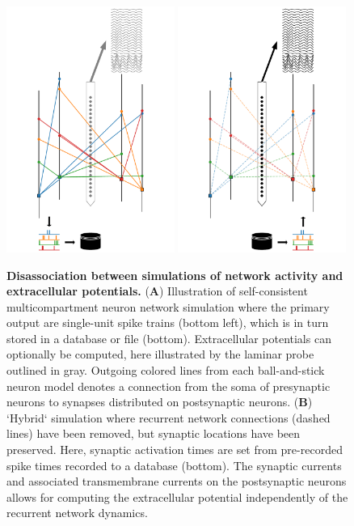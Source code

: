 \begin{figure}[!ht]
\begin{center}
\includegraphics[width=0.49\textwidth]{Figures/Ch-LFPy/Ch-LFPy-hybrid_A.pdf}
\includegraphics[width=0.49\textwidth]{Figures/Ch-LFPy/Ch-LFPy-hybrid_B.pdf}
\end{center}
\caption{\textbf{Disassociation between simulations of network activity and extracellular potentials.}
({\bf A}) Illustration of self-consistent multicompartment neuron network simulation where the primary output are single-unit spike trains (bottom left),
which is in turn stored in a database or file (bottom).
Extracellular potentials can optionally be computed,
here illustrated by the laminar probe outlined in gray.
Outgoing colored lines from each ball-and-stick neuron model denotes a connection from the soma of presynaptic neurons to synapses distributed on postsynaptic neurons.
({\bf B}) `Hybrid` simulation where recurrent network connections (dashed lines) have been removed,
but synaptic locations have been preserved.
Here, synaptic activation times are set from pre-recorded spike times recorded to a database (bottom).
The synaptic currents and associated transmembrane currents on the postsynaptic neurons allows for computing the extracellular potential independently of the recurrent network dynamics.
}
\label{fig:LFPy_hybrid}
\end{figure}




